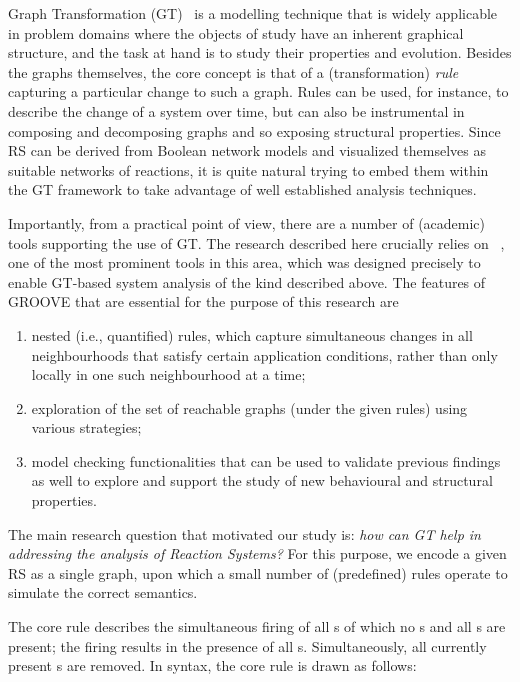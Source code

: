Graph Transformation (GT)~\cite{DBLP:series/eatcs/EhrigEPT06,DBLP:books/sp/HeckelT20} is a modelling technique that is widely applicable in problem domains where the objects of study have an inherent graphical structure, and the task at hand is to study their properties and evolution. Besides the graphs themselves, the core concept is that of a (transformation) \emph{rule} capturing a particular change to such a graph. Rules can be used, for instance, to describe the change of a system over time, but can also be instrumental in composing and decomposing graphs and so exposing structural properties.
Since RS can be derived from Boolean network models and visualized themselves as suitable networks of reactions, it is quite natural trying to embed them within the GT framework to take advantage of well established analysis techniques.

Importantly, from a practical point of view, there are a number of (academic) tools supporting the use of GT. The research described here crucially relies on \href{https://groove.cs.utwente.nl}{\GROOVE}~\cite{DBLP:journals/sttt/GhamarianMRZZ12}, one of the most prominent tools in this area, which was designed precisely to enable GT-based system analysis of the kind described above. The features of GROOVE that are essential for the purpose of this research are
\begin{enumerate}%
\item nested (i.e., quantified) rules, which capture simultaneous changes in all neighbourhoods that satisfy certain application conditions, rather than only locally in one such neighbourhood at a time; 
\item exploration of the set of reachable graphs (under the given rules) using various strategies;
\item model checking functionalities that can be used to validate previous findings as well to explore and support the study of new behavioural and structural properties.
\end{enumerate}

The main research question that motivated our study is: 
\emph{how can GT help in addressing the analysis of Reaction Systems?} 
For this purpose, we encode a given RS as a single graph, upon which a small number of (predefined) rules operate to simulate the correct semantics. 

The core rule describes the simultaneous firing of all s of which no s and all s are present; the firing results in the presence of all s. Simultaneously, all currently present s are removed. In \GROOVE syntax, the core rule is drawn as follows:

